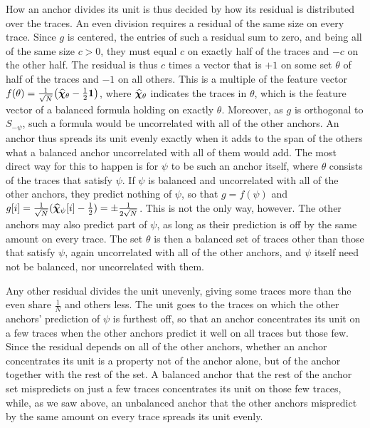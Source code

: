 \documentclass[titlepage,a4paper,11pt]{report}
\begin{document}
    How an anchor divides its unit is thus decided by how its residual is distributed over the traces. An even division requires a residual of the same size on every trace. Since $g$ is centered, the entries of such a residual sum to zero, and being all of the same size $c>0$, they must equal $c$ on exactly half of the traces and $-c$ on the other half. The residual is thus $c$ times a vector that is $+1$ on some set $\theta$ of half of the traces and $-1$ on all others. This is a multiple of the feature vector $f(\theta)=\frac{1}{\sqrt N}\bigl(\bm{\widehat\chi}_\theta-\frac12\mathbf{1}\bigr)$, where $\bm{\widehat\chi}_\theta$ indicates the traces in $\theta$, which is the feature vector of a balanced formula holding on exactly $\theta$. Moreover, as $g$ is orthogonal to $S_{-\psi}$, such a formula would be uncorrelated with all of the other anchors. An anchor thus spreads its unit evenly exactly when it adds to the span of the others what a balanced anchor uncorrelated with all of them would add. The most direct way for this to happen is for $\psi$ to be such an anchor itself, where $\theta$ consists of the traces that satisfy $\psi$. If $\psi$ is balanced and uncorrelated with all of the other anchors, they predict nothing of $\psi$, so that $g=f(\psi)$ and $g[i]=\frac{1}{\sqrt N}(\bm{\widehat\chi}_\psi[i]-\frac12)=\pm\frac{1}{2\sqrt N}$. This is not the only way, however. The other anchors may also predict part of $\psi$, as long as their prediction is off by the same amount on every trace. The set $\theta$ is then a balanced set of traces other than those that satisfy $\psi$, again uncorrelated with all of the other anchors, and $\psi$ itself need not be balanced, nor uncorrelated with them.

    Any other residual divides the unit unevenly, giving some traces more than the even share $\frac1N$ and others less. The unit goes to the traces on which the other anchors' prediction of $\psi$ is furthest off, so that an anchor concentrates its unit on a few traces when the other anchors predict it well on all traces but those few. Since the residual depends on all of the other anchors, whether an anchor concentrates its unit is a property not of the anchor alone, but of the anchor together with the rest of the set. A balanced anchor that the rest of the anchor set mispredicts on just a few traces concentrates its unit on those few traces, while, as we saw above, an unbalanced anchor that the other anchors mispredict by the same amount on every trace spreads its unit evenly. 
    
\end{document}
